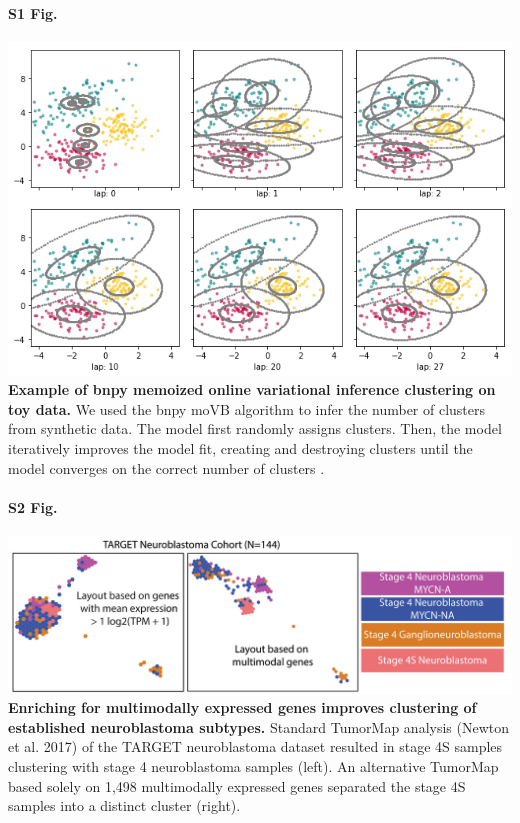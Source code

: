\documentclass[10pt,letterpaper]{article}
\begin{document}
\paragraph*{S1 Fig.}
\includegraphics[width=\textwidth]{img/bnpy-example-fit}
\label{S1_Fig}
{\bf Example of bnpy memoized online variational inference clustering on toy data.} We used the bnpy moVB algorithm to infer the number of clusters from synthetic data. The model first randomly assigns clusters. Then, the model iteratively improves the model fit, creating and destroying clusters until the model converges on the correct number of clusters \cite{hughesBnpyReliableScalable}. 

\paragraph*{S2 Fig.}
\includegraphics[width=\textwidth]{img/TumorMap-NBL-MM-V3-2x}
\label{S2_Fig}
{\bf Enriching for multimodally expressed genes improves clustering of established neuroblastoma subtypes.} Standard TumorMap analysis (Newton et al. 2017) of the TARGET neuroblastoma dataset resulted in stage 4S samples clustering with stage 4 neuroblastoma samples (left). An alternative TumorMap based solely on 1,498 multimodally expressed genes separated the stage 4S samples into a distinct cluster (right).
\end{document}
